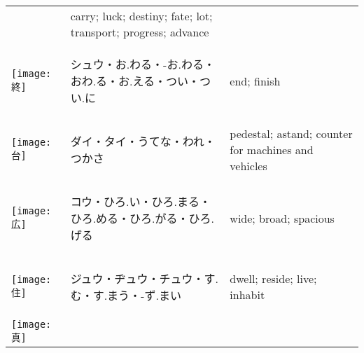\documentclass[a4paper,12pt]{extarticle}
\begin{document}
\begin{longtable}{|lp{6cm}p{4cm}|}
&
carry; luck; destiny; fate; lot; transport; progress; advance
\\ 
\begin{minipage}{0.3\textwidth}
\centerline{
	\texttt{[image: 終]}
}
\end{minipage}
&
\begin{CJK}{UTF8}{min}シュウ・お.わる・-お.わる・おわ.る・お.える・つい・つい.に\end{CJK}
&
end; finish
\\ 
\begin{minipage}{0.3\textwidth}
\centerline{
	\texttt{[image: 台]}
}
\end{minipage}
&
\begin{CJK}{UTF8}{min}ダイ・タイ・うてな・われ・つかさ\end{CJK}
&
pedestal; astand; counter for machines and vehicles
\\ 
\begin{minipage}{0.3\textwidth}
\centerline{
	\texttt{[image: 広]}
}
\end{minipage}
&
\begin{CJK}{UTF8}{min}コウ・ひろ.い・ひろ.まる・ひろ.める・ひろ.がる・ひろ.げる\end{CJK}
&
wide; broad; spacious
\\ 
\begin{minipage}{0.3\textwidth}
\centerline{
	\texttt{[image: 住]}
}
\end{minipage}
&
\begin{CJK}{UTF8}{min}ジュウ・ヂュウ・チュウ・す.む・す.まう・-ず.まい\end{CJK}
&
dwell; reside; live; inhabit
\\ 
\begin{minipage}{0.3\textwidth}
\centerline{
	\texttt{[image: 真]}
}
\end{minipage}
\end{longtable}
\end{document}
